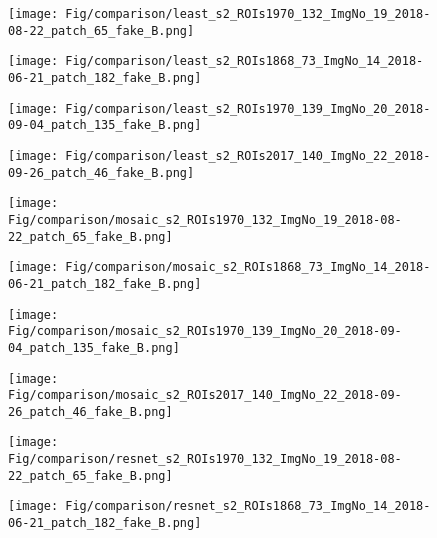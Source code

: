 \documentclass[journal]{IEEEtran}
\begin{document}
\begin{figure*}[h!tb]
  \centering
  \begin{subfigure}[b]{0.2\linewidth}
    \texttt{[image: Fig/comparison/least\_s2\_ROIs1970\_132\_ImgNo\_19\_2018-08-22\_patch\_65\_fake\_B.png]}
  \end{subfigure}
  \begin{subfigure}[b]{0.2\linewidth}
    \texttt{[image: Fig/comparison/least\_s2\_ROIs1868\_73\_ImgNo\_14\_2018-06-21\_patch\_182\_fake\_B.png]}
  \end{subfigure}   
    \begin{subfigure}[b]{0.2\linewidth}
    \texttt{[image: Fig/comparison/least\_s2\_ROIs1970\_139\_ImgNo\_20\_2018-09-04\_patch\_135\_fake\_B.png]}
  \end{subfigure}
      \begin{subfigure}[b]{0.2\linewidth}
    \texttt{[image: Fig/comparison/least\_s2\_ROIs2017\_140\_ImgNo\_22\_2018-09-26\_patch\_46\_fake\_B.png]}
  \end{subfigure}
  \begin{subfigure}[b]{0.2\linewidth}
    \texttt{[image: Fig/comparison/mosaic\_s2\_ROIs1970\_132\_ImgNo\_19\_2018-08-22\_patch\_65\_fake\_B.png]}
  \end{subfigure}
    \begin{subfigure}[b]{0.2\linewidth}
    \texttt{[image: Fig/comparison/mosaic\_s2\_ROIs1868\_73\_ImgNo\_14\_2018-06-21\_patch\_182\_fake\_B.png]}
  \end{subfigure}
    \begin{subfigure}[b]{0.2\linewidth}
    \texttt{[image: Fig/comparison/mosaic\_s2\_ROIs1970\_139\_ImgNo\_20\_2018-09-04\_patch\_135\_fake\_B.png]}
  \end{subfigure}
  \begin{subfigure}[b]{0.2\linewidth}
    \texttt{[image: Fig/comparison/mosaic\_s2\_ROIs2017\_140\_ImgNo\_22\_2018-09-26\_patch\_46\_fake\_B.png]}
  \end{subfigure}   
    \begin{subfigure}[b]{0.2\linewidth}
    \texttt{[image: Fig/comparison/resnet\_s2\_ROIs1970\_132\_ImgNo\_19\_2018-08-22\_patch\_65\_fake\_B.png]}
  \end{subfigure}
      \begin{subfigure}[b]{0.2\linewidth}
    \texttt{[image: Fig/comparison/resnet\_s2\_ROIs1868\_73\_ImgNo\_14\_2018-06-21\_patch\_182\_fake\_B.png]}
  \end{subfigure}

\end{figure*}
\end{document}
